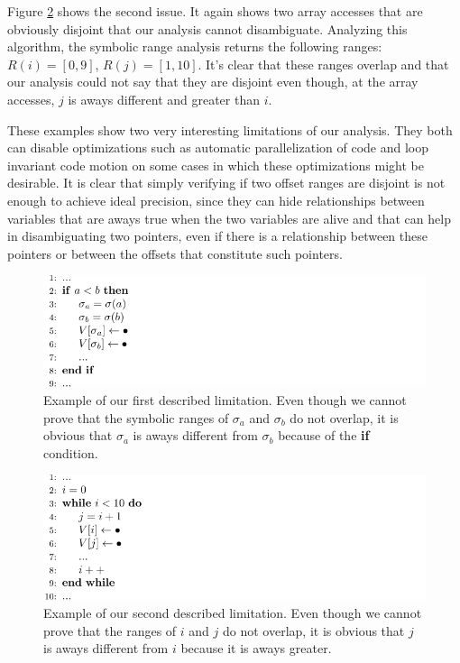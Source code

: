 \documentclass[12pt]{article}
\begin{document}
Figure \ref{fig:lim2} shows the second issue. It again shows two array accesses 
that are obviously disjoint that our analysis cannot disambiguate. Analyzing this 
algorithm, the symbolic range analysis returns the following ranges: 
$R(i) = [0, 9]$, $R(j) = [1, 10]$. It's clear that these ranges overlap and 
that our analysis could not say that they are disjoint even though, at the 
array accesses, $j$ is aways different and greater than $i$. 

These examples show two very interesting limitations of our analysis. They 
both can disable optimizations such as automatic parallelization of code and 
loop invariant code motion on some cases in which these optimizations might be 
desirable. It is clear that simply verifying if two offset ranges are disjoint 
is not enough to achieve ideal precision, since they can hide relationships 
between variables that are aways true when the two variables are alive and 
that can help in disambiguating two pointers, even if there is a relationship 
between these pointers or between the offsets that constitute such pointers. 
 

\begin{figure}[t!]
  \centering
\includegraphics[width=\linewidth]{img/limitation}
  \caption{Example of our first described limitation. Even though we cannot 
  prove that the symbolic ranges of $\sigma_a$ and $\sigma_b$ do not overlap, 
  it is obvious that $\sigma_a$ is aways different from $\sigma_b$ because of 
  the \textbf{if} condition.}
  \label{fig:lim1}
\end{figure}

\begin{figure}[t!]
  \centering
\includegraphics[width=\linewidth]{img/limitation2}
  \caption{Example of our second described limitation. Even though we cannot 
  prove that the ranges of $i$ and $j$ do not overlap, 
  it is obvious that $j$ is aways different from $i$ because it is 
  aways greater.}
  \label{fig:lim2}
\end{figure}
\end{document}
